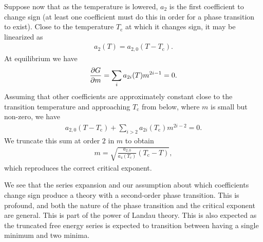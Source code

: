 Suppose now that as the temperature is lowered, $a_{2}$ is the first coefficient to change sign (at least one coefficient must do this in order for a phase transition to exist). Close to the temperature $T_{\text{c}}$ at which it changes sign, it may be linearized as
\begin{align*}
	a_{2}(T) = a_{2, 0}(T - T_{\text{c}}).
\end{align*}
At equilibrium we have
\begin{align*}
	\pdv{G}{m} = \sum\limits_{i}a_{2i}(T)m^{2i - 1} = 0.
\end{align*}
Assuming that other coefficients are approximately constant close to the transition temperature and approaching $T_{\text{c}}$ from below, where $m$ is small but non-zero, we have
\begin{align*}
	a_{2, 0}(T - T_{\text{c}}) + \sum\limits_{i > 2}a_{2i}(T_{\text{c}})m^{2i - 2} = 0.
\end{align*}
We truncate this sum at order $2$ in $m$ to obtain
\begin{align*}
	m = \sqrt{\frac{a_{2, 0}}{a_{4}(T_{\text{c}})}(T_{\text{c}} - T)},
\end{align*}
which reproduces the correct critical exponent.

We see that the series expansion and our assumption about which coefficients change sign produce a theory with a second-order phase transition. This is profound, and both the nature of the phase transition and the critical exponent are general. This is part of the power of Landau theory. This is also expected as the truncated free energy series is expected to transition between having a single minimum and two minima.

